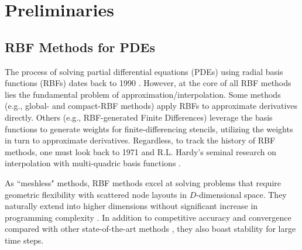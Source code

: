 \documentclass{report}
\begin{document}
\fi

{ \graphicspath{{rbffd_methods_content/}} 


\part{Preliminaries}


\chapter{RBF Methods for PDEs}

The process of solving partial differential equations (PDEs) using radial basis functions (RBFs) dates back to 1990 \cite{Kansa1990a,Kansa1990b}. However, at the core of all RBF methods lies the fundamental problem of approximation/interpolation. Some methods (e.g., global- and compact-RBF methods) apply RBFs to approximate derivatives directly. Others (e.g., RBF-generated Finite Differences) leverage the basis functions to generate weights for finite-differencing stencils, utilizing the weights in turn to approximate derivatives. Regardless, to track the history of RBF methods, one must look back to 1971 and R.L. Hardy's seminal research on interpolation with multi-quadric basis functions \cite{Hardy1971}. 

As ``meshless" methods, RBF methods excel at solving problems that require geometric flexibility with scattered node layouts in $D$-dimensional space. They naturally extend into higher dimensions without significant increase in programming complexity \cite{FlyerWright07,WrightFlyerYuen10}. In addition to competitive accuracy and convergence compared with other state-of-the-art methods \cite{FlyerWright07, FlyerWright09, FlyerLehto10, WrightFlyerYuen10, FlyerFornberg11}, they also boast stability for large time steps.

}
\end{document}
